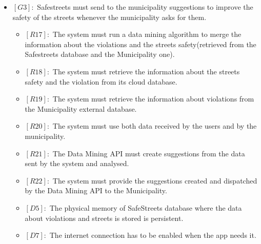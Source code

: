 \documentclass[titlepage]{article}
\begin{document}
\begin{itemize}
 \item $[G3]:$ Safestreets must send to the municipality suggestions to improve the safety of the streets whenever the municipality asks for them.
 \begin{itemize}
 \item $[R17]:$ The system must run a data mining algorithm to merge the information about the violations and the streets safety(retrieved from the Safestreets database and the Municipality one).
 \item $[R18]:$ The system must retrieve the information about the streets safety and the violation from its cloud database.
 \item $[R19]:$ The system must retrieve the information about violations from the Municipality external database.
 \item $[R20]:$ The system must use both data received by the users and by the municipality.
 \item $[R21]:$ The Data Mining API must create suggestions from the data sent by the system and analysed.
 \item $[R22]:$ The system must provide the suggestions created and dispatched by the Data Mining API to the Municipality.
 \item $[D5]:$ The physical memory of SafeStreets database where the data about violations and streets is stored is persistent.
 \item $[D7]:$ The internet connection has to be enabled when the app needs it.
 \end{itemize}
 

\end{itemize}
\end{document}
